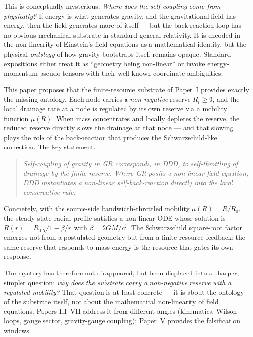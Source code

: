 \documentclass[11pt,a4paper]{article}
\begin{document}
This is conceptually mysterious. \emph{Where does the self-coupling
come from physically?} If energy is what generates gravity, and the
gravitational field has energy, then the field generates more of
itself --- but the back-reaction loop has no obvious mechanical
substrate in standard general relativity. It is encoded in the
non-linearity of Einstein's field equations as a mathematical
identity, but the physical \emph{ontology} of how gravity bootstraps
itself remains opaque. Standard expositions either treat it as
``geometry being non-linear'' or invoke energy-momentum
pseudo-tensors with their well-known coordinate ambiguities.

This paper proposes that the finite-resource substrate of Paper~I
provides exactly the missing ontology. Each node carries a
\emph{non-negative} reserve $R_i \geq 0$, and the local drainage
rate at a node is regulated by its own reserve via a mobility
function $\mu(R)$. When mass concentrates and locally depletes the
reserve, the reduced reserve directly slows the drainage at that
node --- and that slowing plays the role of the back-reaction that
produces the Schwarzschild-like correction. The key statement:
\begin{quote}
\emph{Self-coupling of gravity in GR corresponds, in DDD, to
self-throttling of drainage by the finite reserve. Where GR posits
a non-linear field equation, DDD instantiates a non-linear
self-back-reaction directly into the local conservative rule.}
\end{quote}

Concretely, with the source-side bandwidth-throttled mobility
$\mu(R) = R/R_0$, the steady-state radial profile satisfies a
non-linear ODE whose solution is $R(r) = R_0\,\sqrt{1 - \beta/r}$
with $\beta = 2GM/c^2$. The Schwarzschild square-root factor emerges
not from a postulated geometry but from a finite-resource feedback:
the same reserve that responds to mass-energy is the resource that
gates its own response.

The mystery has therefore not disappeared, but been displaced into a
sharper, simpler question: \emph{why does the substrate carry a
non-negative reserve with a regulated mobility?} That question is at
least concrete --- it is about the ontology of the substrate itself,
not about the mathematical non-linearity of field equations. Papers
III--VII address it from different angles (kinematics, Wilson loops,
gauge sector, gravity-gauge coupling); Paper~V provides the
falsification windows.
\end{document}
